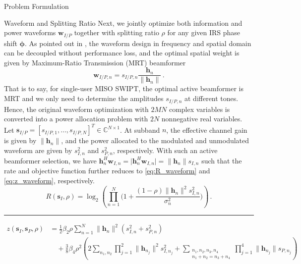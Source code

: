 \documentclass[journal]{IEEEtran}
\begin{document}
\begin{section}{Problem Formulation}
		\begin{subsection}{Waveform and Splitting Ratio}
			Next, we jointly optimize both information and power waveforms $\boldsymbol{w}_{I/P}$ together with splitting ratio $\rho$ for any given IRS phase shift $\boldsymbol{\phi}$. As pointed out in \cite{Clerckx2018b}, the waveform design in frequency and spatial domain can be decoupled without performance loss, and the optimal spatial weight is given by Maximum-Ratio Transmission (MRT) beamformer
			\begin{equation}\label{eq:w_IP}
				\boldsymbol{w}_{I/P,n}=s_{I/P,n}\frac{\boldsymbol{h}_n}{\lVert{\boldsymbol{h}_n}\rVert}\,.
			\end{equation}
			That is to say, for single-user MISO SWIPT, the optimal active beamformer is MRT and we only need to determine the amplitudes $s_{I/P,n}$ at different tones. Hence, the original waveform optimization with $2MN$ complex variables is converted into a power allocation problem with $2N$ nonnegative real variables. Let $\boldsymbol{s}_{I/P}=[s_{I/P,1},\dots,s_{I/P,N}]^T \in \mathbb{C}^{N \times 1}$. At subband $n$, the effective channel gain is given by $\lVert{\boldsymbol{h}_n}\rVert$, and the power allocated to the modulated and unmodulated waveform are given by $s_{I,n}^2$ and $s_{P,n}^2$, respectively. With such an active beamformer selection, we have $\boldsymbol{h}_n^H\boldsymbol{w}_{I,n}=\lvert{\boldsymbol{h}_n^H\boldsymbol{w}_{I,n}}\rvert=\lVert{\boldsymbol{h}_n}\rVert s_{I,n}$ such that the rate and objective function further reduces to \ref{eq:R_waveform} and \ref{eq:z_waveform}, respectively.
			\begin{equation}\label{eq:R_waveform}
				R(\boldsymbol{s}_I,\rho) = \log_2\left(\prod_{n=1}^N\biggl(1+\frac{(1-\rho)\lVert{\boldsymbol{h}_n}\rVert^2 s_{I,n}^2}{\sigma_n^2}\biggr)\right)\,.
			\end{equation}
			\begin{figure*}[b]
				\hrule
				\begin{align}
					z(\boldsymbol{s}_I,\boldsymbol{s}_P,\rho)
					& = \frac{1}{2}{\beta_2}{\rho} \sum_{n=1}^N \lVert{\boldsymbol{h}_n}\rVert^2(s_{I,n}^2+s_{P,n}^2)\nonumber\\
					& \quad + \frac{3}{8}{\beta_4}{\rho^2} \left( 2\sum_{n_1,n_2} \prod_{j=1}^2 \lVert{\boldsymbol{h}_{n_j}}\rVert^2 s_{I,{n_j}}^2 + \sum_{\substack{{n_1},{n_2},{n_3},{n_4}\\{n_1}+{n_2}={n_3}+{n_4}}} \prod_{j=1}^4 \lVert{\boldsymbol{h}_{n_j}}\rVert s_{P,{n_j}} \right)\nonumber\\

\end{align}
\end{figure*}
\end{subsection}
\end{section}
\end{document}
